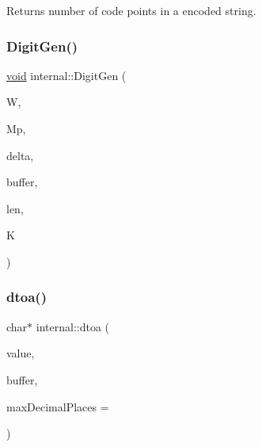 Returns number of code points in a encoded string. 

\mbox{\label{namespaceinternal_a47be9aea8d0f9cae49dc03dc046d2450}} 
\subsubsection{\texorpdfstring{Digit\+Gen()}{DigitGen()}}
{\footnotesize\ttfamily \hyperlink{imgui__impl__opengl3__loader_8h_ac668e7cffd9e2e9cfee428b9b2f34fa7}{void} internal\+::\+Digit\+Gen (\begin{DoxyParamCaption}\item[{const \hyperlink{structinternal_1_1DiyFp}{Diy\+Fp} \&}]{W,  }\item[{const \hyperlink{structinternal_1_1DiyFp}{Diy\+Fp} \&}]{Mp,  }\item[{\hyperlink{stdint_8h_aec6fcb673ff035718c238c8c9d544c47}{uint64\+\_\+t}}]{delta,  }\item[{char $\ast$}]{buffer,  }\item[{int $\ast$}]{len,  }\item[{int $\ast$}]{K }\end{DoxyParamCaption})\hspace{0.3cm}{\ttfamily [inline]}}

\mbox{\label{namespaceinternal_a2547fbfd0790a9997cb5fb7b543f0485}} 
\subsubsection{\texorpdfstring{dtoa()}{dtoa()}}
{\footnotesize\ttfamily char$\ast$ internal\+::dtoa (\begin{DoxyParamCaption}\item[{double}]{value,  }\item[{char $\ast$}]{buffer,  }\item[{int}]{max\+Decimal\+Places = {} }\end{DoxyParamCaption})\hspace{0.3cm}{\ttfamily [inline]}}

\mbox{\label{namespaceinternal_aa1bb51d788788eb5390a16462b40d98d}} 
